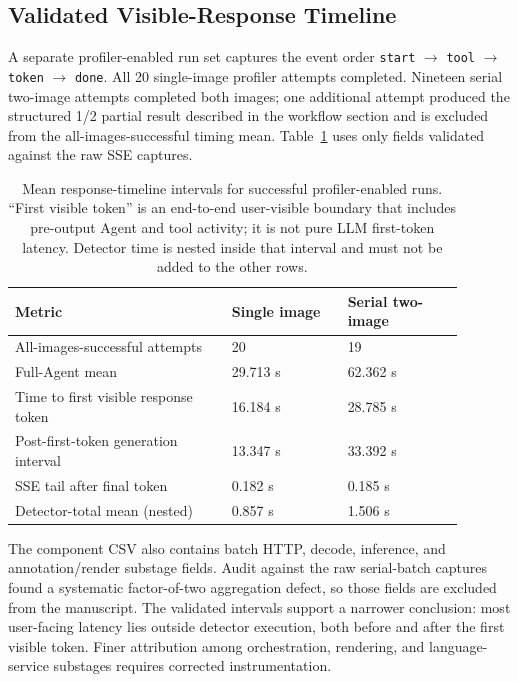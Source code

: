 \subsection{Validated Visible-Response Timeline}

A separate profiler-enabled run set captures the event order \texttt{start} $\rightarrow$ \texttt{tool} $\rightarrow$ \texttt{token} $\rightarrow$ \texttt{done}. All 20 single-image profiler attempts completed. Nineteen serial two-image attempts completed both images; one additional attempt produced the structured 1/2 partial result described in the workflow section and is excluded from the all-images-successful timing mean. Table~\ref{tab:response_timeline} uses only fields validated against the raw SSE captures.

\begin{table}[htbp]
\centering
\small
\renewcommand{\arraystretch}{1.13}
\setlength{\tabcolsep}{4pt}
\caption{Mean response-timeline intervals for successful profiler-enabled runs. ``First visible token'' is an end-to-end user-visible boundary that includes pre-output Agent and tool activity; it is not pure LLM first-token latency. Detector time is nested inside that interval and must not be added to the other rows.}
\label{tab:response_timeline}
\begin{tabular}{p{0.43\linewidth}p{0.23\linewidth}p{0.23\linewidth}}
\toprule
\rowcolor{gray!12}
\textbf{Metric} & \textbf{Single image} & \textbf{Serial two-image} \\
\midrule
All-images-successful attempts & 20 & 19 \\
\rowcolor{graybg}
Full-Agent mean & 29.713 s & 62.362 s \\
Time to first visible response token & 16.184 s & 28.785 s \\
\rowcolor{graybg}
Post-first-token generation interval & 13.347 s & 33.392 s \\
SSE tail after final token & 0.182 s & 0.185 s \\
\rowcolor{graybg}
Detector-total mean (nested) & 0.857 s & 1.506 s \\
\bottomrule
\end{tabular}
\end{table}

The component CSV also contains batch HTTP, decode, inference, and annotation/render substage fields. Audit against the raw serial-batch captures found a systematic factor-of-two aggregation defect, so those fields are excluded from the manuscript. The validated intervals support a narrower conclusion: most user-facing latency lies outside detector execution, both before and after the first visible token. Finer attribution among orchestration, rendering, and language-service substages requires corrected instrumentation.

